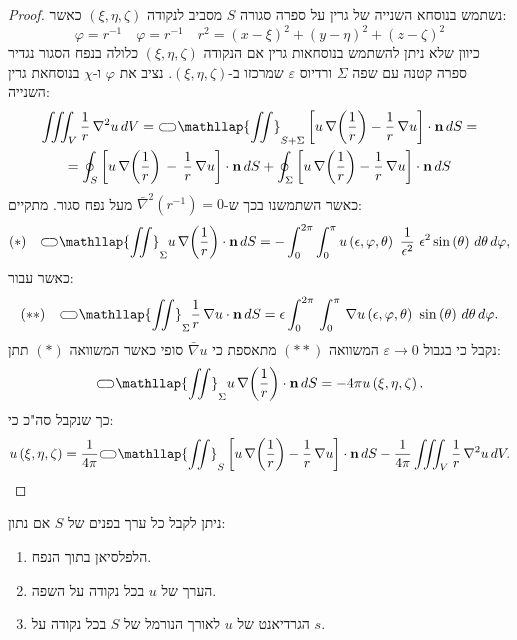 \documentclass{tstextbook}
\begin{document}
\begin{proof}
נשתמש בנוסחא השנייה של גרין על ספרה סגורה \(S\) מסביב לנקודה \((\xi,\eta,\zeta)\) כאשר:
$$\varphi=r^{-1} \quad \varphi=r^{-1}\quad r^{2}=\left( x{-}\xi \right)^{2}{+}\left( y{-}\eta \right)^{2}{+}\left( z{-}\zeta \right)^{2}$$
כיוון שלא ניתן להשתמש בנוסחאות גרין אם הנקודה \(\left( \xi,\eta,\zeta \right)\) כלולה בנפח הסגור נגדיר ספרה קטנה עם שפה \(\Sigma\) ורדיוס \(\varepsilon\) שמרכזו ב-\((\xi,\eta,\zeta)\). נציב את \(\varphi\) ו-\(\chi\) בנוסחאת גרין השנייה:
\begin{gather*}\iiint_{V}{\frac{1}{r}}\,\nabla^{2}u\,d V={\subset\!\supset} \mathllap{\iint}_{S+\Sigma}\left[u\,\nabla\!\left({\frac{1}{r}}\right)-{\frac{1}{r}}\,\nabla u\right]\cdot\mathbf{n}\,d S=\\=\oint_{S}\left[u\,\nabla\!\left({\frac{1}{r}}\right)\,-\,{\frac{1}{r}}\,\nabla u\right]\cdot\mathbf{n}\,d S+\oint_{\Sigma}\left[u\,\nabla\!\left({\frac{1}{r}}\right)-{\frac{1}{r}}\,\nabla u\right]\cdot\mathbf{n}\,d S 
\end{gather*}
כאשר השתמשנו בכך ש-\(\bar{\nabla}^2(r^{-1})=0\) מעל נפח סגור. מתקיים:
$$(*)\quad {\subset\!\supset} \mathllap{\iint}_{\Sigma}u\,\nabla\!\left({\frac{1}{r}}\right)\cdot\mathbf{n}\,d S=-\int_{0}^{2\pi}\int_{0}^{\pi}u\left( \epsilon,\varphi,\theta \right)\,\,{\frac{1}{\epsilon^{2}}}\,\,\epsilon^{2}\sin\left( \theta \right)\,d\theta\,d\varphi,$$
כאשר עבור:
$$(* *)\quad {\subset\!\supset} \mathllap{\iint}_{\Sigma}{\frac{1}{r}}\,\nabla u\cdot\mathbf{n}\,d S=\epsilon\int_{0}^{2\pi}\,\int_{0}^{\pi}\,\nabla u\left( \epsilon,\varphi,\theta \right)\ \sin\left( \theta \right)\,d\theta\,d\varphi.$$
נקבל כי בגבול \(\varepsilon\to 0\) המשוואה \((* *)\) מתאספת כי \(\bar{\nabla}u\) סופי כאשר המשוואה \((*)\) תתן:
$${\subset\!\supset} \mathllap{\iint}_{\Sigma}u\,\nabla\!\left({\frac{1}{r}}\right)\cdot\mathbf{n}\,d S=-4\pi u\left( \xi,\eta,\zeta \right).$$
כך שנקבל סה"כ כי:
$$u\left( \xi,\eta,\zeta \right)={\frac{1}{4\pi}}{\subset\!\supset} \mathllap{\iint}_{S}\left[u\,\nabla\!\left({\frac{1}{r}}\right)-{\frac{1}{r}}\,\nabla u\right]\cdot\mathbf{n}\,d S-{\frac{1}{4\pi}}\iiint_{V}{\frac{1}{r}}\,\nabla^{2}u\,d V.$$

\end{proof}
\begin{corollary}
ניתן לקבל כל ערך בפנים של \(S\) אם נתון:

  \begin{enumerate}
    \item הלפלסיאן בתוך הנפח. 


    \item הערך של \(u\) בכל נקודה על השפה. 


    \item הגרדיאנט של \(u\) לאורך הנורמל של \(S\) בכל נקודה על \(s\). 


  \end{enumerate}
\end{corollary}
\end{document}
